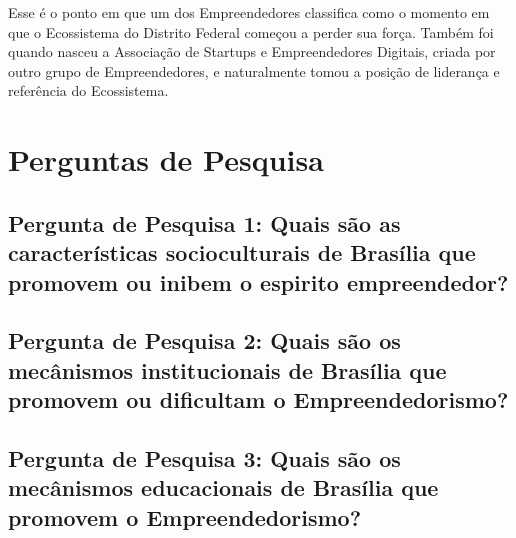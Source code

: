 Esse é o ponto em que um dos Empreendedores classifica como o momento em que o Ecossistema do Distrito Federal começou a perder sua força. Também foi quando nasceu a Associação de Startups e Empreendedores Digitais, criada por outro grupo de Empreendedores, e naturalmente tomou a posição de liderança e referência do Ecossistema.

\section{Perguntas de Pesquisa}
\label{section:perguntas_de_pesquisa}

\subsection{Pergunta de Pesquisa 1: Quais são as características socioculturais de Brasília que promovem ou inibem o espirito empreendedor?}
\label{subsection:pergunta_de_pesquisa_1}


\subsection{Pergunta de Pesquisa 2: Quais são os mecânismos institucionais de Brasília que promovem ou dificultam o Empreendedorismo?}
\label{subsection:pergunta_de_pesquisa_2}

  
\subsection{Pergunta de Pesquisa 3: Quais são os mecânismos educacionais de Brasília que promovem o Empreendedorismo?}
\label{subsection:pergunta_de_pesquisa_3}


